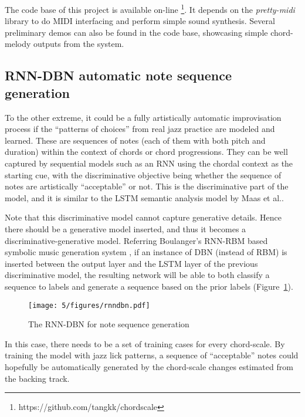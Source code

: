 The code base of this project is available on-line \footnote{https://github.com/tangkk/chordscale}. It depends on the \textit{pretty-midi} \cite{raffel2014intuitive} library to do MIDI interfacing and perform simple sound synthesis. Several preliminary demos can also be found in the code base, showcasing simple chord-melody outputs from the system.

\subsection{RNN-DBN automatic note sequence generation}
To the other extreme, it could be a fully artistically automatic improvisation process if the ``patterns of choices'' from real jazz practice \cite{jazzguitarimpro,pracjazz} are modeled and learned. These are sequences of notes (each of them with both pitch and duration) within the context of chords or chord progressions. They can be well captured by sequential models such as an RNN using the chordal context as the starting cue, with the discriminative objective being whether the sequence of notes are artistically ``acceptable'' or not. This is the discriminative part of the model, and it is similar to the LSTM semantic analysis model by Maas et al.\cite{maas2011learning}.

Note that this discriminative model cannot capture generative details. Hence there should be a generative model inserted, and thus it becomes a discriminative-generative model. Referring Boulanger's RNN-RBM based symbolic music generation system \cite{boulanger2012modeling}, if an instance of DBN (instead of RBM) is inserted between the output layer and the LSTM layer of the previous discriminative model, the resulting network will be able to both classify a sequence to labels and generate a sequence based on the prior labels (Figure~\ref{fig:5-rnndbn}).

\begin{figure}[htb]
    \centering
        \texttt{[image: 5/figures/rnndbn.pdf]}
    \caption{The RNN-DBN for note sequence generation}
    \label{fig:5-rnndbn}
\end{figure}

In this case, there needs to be a set of training cases for every chord-scale. By training the model with jazz lick patterns, a sequence of ``acceptable'' notes could hopefully be automatically generated by the chord-scale changes estimated from the backing track.





 






